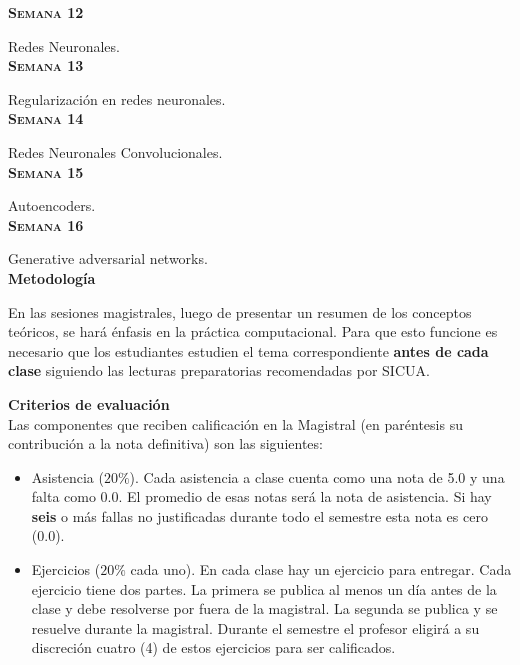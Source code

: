 \documentclass[letterpaper,10pt,onecolumn]{article}
\begin{document}
\noindent\textbf{\textsc{Semana 12}}


Redes Neuronales. 
\\[-0.3cm]

\noindent\textbf{\textsc{Semana 13}}

Regularizaci\'on en redes neuronales. 
\\[-0.3cm]


\noindent\textbf{\textsc{Semana 14}}

Redes Neuronales Convolucionales. 
\\[-0.3cm]

\noindent\textbf{\textsc{Semana 15}}

Autoencoders. %
\\[-0.3cm]

\noindent\textbf{\textsc{Semana 16}}

Generative adversarial networks.
\\[0.1cm]


\vspace*{0.5cm} 
\noindent\textbf{\large {} \quad
  Metodolog\'ia}\\[-0.2cm] 


\noindent\normalsize 

En las sesiones magistrales, luego de presentar un resumen de
los conceptos te\'oricos, se har\'a \'enfasis en la pr\'actica computacional.
Para que esto funcione es necesario que los estudiantes estudien el
tema correspondiente {\bf antes de cada clase} siguiendo las lecturas
preparatorias recomendadas por SICUA.

\vspace*{0.5cm} 
\noindent\textbf{\large {} \quad Criterios de
  evaluaci\'on}\\[-0.2cm] 

Las componentes que reciben calificaci\'on en la Magistral (en
par\'entesis su contribuci\'on a la nota definitiva) son las
siguientes:  

\begin{itemize}
\item Asistencia ($20\%$). Cada asistencia a clase cuenta como una
  nota de 5.0 y una falta como 0.0. El promedio de esas notas ser\'a
  la nota de asistencia. 
  Si hay {\bf seis} o m\'as fallas no justificadas durante todo el
  semestre esta nota es cero (0.0).
\item Ejercicios ($20\%$ cada uno). En cada clase hay un ejercicio para
  entregar. Cada ejercicio tiene dos partes. 
  La primera se publica al menos un d\'ia antes de la clase y debe
  resolverse por fuera de la magistral. 
  La segunda se publica y se resuelve durante la magistral.
  Durante el semestre el profesor eligir\'a a su discreci\'on cuatro (4)
  de estos ejercicios para ser calificados. 
\end{itemize}
\end{document}
